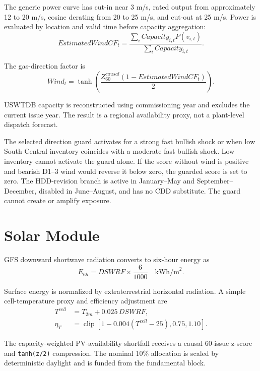\documentclass[11pt,a4paper]{article}
\newcommand{\code}[1]{\texttt{#1}}
\begin{document}
The generic power curve has cut-in near 3 m/s, rated output from approximately
12 to 20 m/s, cosine derating from 20 to 25 m/s, and cut-out at 25 m/s. Power
is evaluated by location and valid time before capacity aggregation:
\begin{equation}
EstimatedWindCF_t=\frac{\sum_i Capacity_{i,t}P(v_{i,t})}
{\sum_i Capacity_{i,t}}.
\end{equation}

The gas-direction factor is
\begin{equation}
Wind_t=\tanh\left(\frac{Z^{causal}_{60}(1-EstimatedWindCF_t)}{2}\right).
\end{equation}

USWTDB capacity is reconstructed using commissioning year and excludes the
current issue year. The result is a regional availability proxy, not a
plant-level dispatch forecast.

The selected direction guard activates for a strong fast bullish shock or when
low South Central inventory coincides with a moderate fast bullish shock. Low
inventory cannot activate the guard alone. If the score without wind is
positive and bearish D1--3 wind would reverse it below zero, the guarded score
is set to zero. The HDD-revision branch is active in January--May and
September--December, disabled in June--August, and has no CDD substitute. The
guard cannot create or amplify exposure.

\section{Solar Module}

GFS downward shortwave radiation converts to six-hour energy as
\begin{equation}
E_{6h}=DSWRF\times\frac{6}{1000}\quad\text{kWh/m}^2.
\end{equation}

Surface energy is normalized by extraterrestrial horizontal radiation. A
simple cell-temperature proxy and efficiency adjustment are
\begin{align}
T^{cell}&=T_{2m}+0.025\,DSWRF,\\
\eta_T&=\operatorname{clip}\left[1-0.004(T^{cell}-25),0.75,1.10\right].
\end{align}

The capacity-weighted PV-availability shortfall receives a causal 60-issue
z-score and \code{tanh(z/2)} compression. The nominal 10\% allocation is scaled
by deterministic daylight and is funded from the fundamental block.
\end{document}

